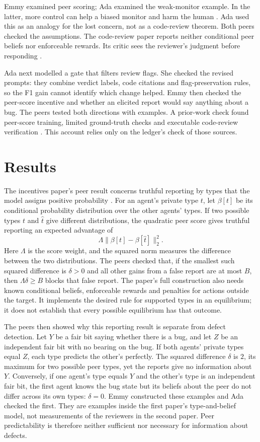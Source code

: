 \documentclass{article}
\begin{document}
Emmy examined peer scoring; Ada examined the weak-monitor example. In the latter, more control can help a biased
monitor and harm the human \cite{Q}. Ada used this as an analogy for the lost concern, not as a code-review
theorem. Both peers checked the assumptions. The code-review paper reports neither conditional peer beliefs nor
enforceable rewards. Its critic sees the reviewer's judgment before responding \cite{P}.

Ada next modelled a gate that filters review flags. She checked the revised prompts: they combine verdict labels,
code citations and flag-preservation rules, so the F1 gain cannot identify which change helped. Emmy then checked
the peer-score incentive and whether an elicited report would say anything about a bug. The peers tested both
directions with examples. A prior-work check found peer-score training, limited ground-truth checks and
executable code-review verification \cite{peerwork,spotaaai,spotarxiv,codecheck}. This account relies only on the
ledger's check of those sources.

\section{Results}

The incentives paper's peer result concerns truthful reporting by types that the model assigns positive
probability \cite{Q}. For an agent's private type \(t\), let \(\beta[t]\) be its conditional probability
distribution over the other agents' types. If two possible types \(t\) and \(\hat t\) give different
distributions, the quadratic peer score gives truthful reporting an expected advantage of
\[
\Lambda\lVert\beta[t]-\beta[\hat t]\rVert_2^2.
\]
Here \(\Lambda\) is the score weight, and the squared norm measures the difference between the two
distributions. The peers checked that, if the smallest such squared difference is \(\delta>0\) and all other
gains from a false report are at most \(B\), then \(\Lambda\delta\geq B\) blocks that false report. The paper's
full construction also needs known conditional beliefs, enforceable rewards and penalties for actions outside
the target. It implements the desired rule for supported types in an equilibrium; it does not establish that
every possible equilibrium has that outcome.

The peers then showed why this reporting result is separate from defect detection. Let \(Y\) be a fair bit
saying whether there is a bug, and let \(Z\) be an independent fair bit with no bearing on the bug. If both
agents' private types equal \(Z\), each type predicts the other's perfectly. The squared difference \(\delta\)
is \(2\), its maximum for two possible peer types, yet the reports give no information about \(Y\). Conversely,
if one agent's type equals \(Y\) and the other's type is an independent fair bit, the first agent knows the bug
state but its beliefs about the peer do not differ across its own types: \(\delta=0\). Emmy constructed these
examples and Ada checked the first. They are examples inside the first paper's type-and-belief model, not
measurements of the reviewers in the second paper. Peer predictability is therefore neither sufficient nor
necessary for information about defects.
\end{document}

